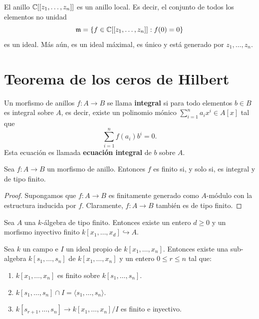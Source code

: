 \begin{propo}
    El anillo $\mathbb{C}[[z_1,\dots,z_n]]$ es un anillo local. Es decir, el conjunto de todos los elementos no unidad
    \begin{equation*}
        \mathfrak{m}=\{f\in  \mathbb{C}[[z_1,\dots,z_n]]:f(0)=0\}
    \end{equation*}
    es un ideal. Más aún, es un ideal máximal, es único y está generado por $z_1,\dots,z_n$.
\end{propo}

\section{Teorema de los ceros de Hilbert}

Un morfismo de anillos $f:A\to B$ se llama \textbf{integral} si para todo elementos $b\in B$ es integral sobre $A$, es decir, existe un polinomio mónico $\sum_{i=1}^na_ix^i\in A[x]$ tal que
\begin{equation*}
	\sum_{i=1}^{n}f(a_i)b^i=0.
\end{equation*}
Esta ecuación es llamada \textbf{ecuación integral} de $b$ sobre $A$. 

\begin{propo}
	Sea $f:A\to B$ un morfismo de anillo. Entonces $f$ es finito si, y solo si, es integral y de tipo finito.
\end{propo}
\begin{proof}
	Supongamos que $f:A\to B$ es finitamente generado como $A$-módulo con la estructura inducida por $f$. Claramente, $f:A\to B$ también es de tipo finito. 
\end{proof}


\begin{theorem}
	Sea $A$ una $k$-álgebra de tipo finito. Entonces existe un entero $d\geq 0$ y un morfismo inyectivo finito $k[x_1,\dots,x_d]\hookrightarrow A$.
\end{theorem}


\begin{corollary}
	Sea $k$ un campo e $I$ un ideal propio de $k[x_1,\dots, x_n]$. Entonces existe una sub-algebra $k[s_1,\dots,s_n]$ de $k[x_1,\dots,x_n]$ y un entero $0\leq r\leq n$ tal que:
	\begin{enumerate}
		\item $k[x_1,\dots,x_n]$ es finito sobre $k[s_1,\dots,s_n]$.
		\item $k[s_1,\dots,s_n]\cap I=\langle s_1,\dots,s_n\rangle$.
		\item $k[s_{r+1},\dots,s_n]\to k[x_1,\dots,x_n]/I$ es finito e inyectivo. 
	\end{enumerate}
\end{corollary}

